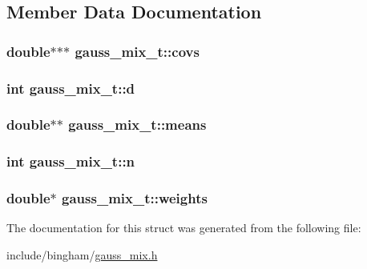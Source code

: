 \subsection{Member Data Documentation}
\hypertarget{structgauss__mix__t_acc4f1f686c1d0a9c61c7879fa7cfe7d5}{
\subsubsection[{covs}]{\setlength{\rightskip}{0pt plus 5cm}double$\ast$$\ast$$\ast$ {\bf gauss\_\-mix\_\-t::covs}}}
\label{structgauss__mix__t_acc4f1f686c1d0a9c61c7879fa7cfe7d5}
\hypertarget{structgauss__mix__t_a881d5ed8cdff3267b86104fc0fa59d23}{
\subsubsection[{d}]{\setlength{\rightskip}{0pt plus 5cm}int {\bf gauss\_\-mix\_\-t::d}}}
\label{structgauss__mix__t_a881d5ed8cdff3267b86104fc0fa59d23}
\hypertarget{structgauss__mix__t_abb85693a2d775f6ba34d1100b477c0fb}{
\subsubsection[{means}]{\setlength{\rightskip}{0pt plus 5cm}double$\ast$$\ast$ {\bf gauss\_\-mix\_\-t::means}}}
\label{structgauss__mix__t_abb85693a2d775f6ba34d1100b477c0fb}
\hypertarget{structgauss__mix__t_a9d5ac0b73ca6f79f565336d55bf5b542}{
\subsubsection[{n}]{\setlength{\rightskip}{0pt plus 5cm}int {\bf gauss\_\-mix\_\-t::n}}}
\label{structgauss__mix__t_a9d5ac0b73ca6f79f565336d55bf5b542}
\hypertarget{structgauss__mix__t_a6893efd45b8fc3c2429edb0ed86b4976}{
\subsubsection[{weights}]{\setlength{\rightskip}{0pt plus 5cm}double$\ast$ {\bf gauss\_\-mix\_\-t::weights}}}
\label{structgauss__mix__t_a6893efd45b8fc3c2429edb0ed86b4976}


The documentation for this struct was generated from the following file:\begin{DoxyCompactItemize}
\item 
include/bingham/\hyperlink{gauss__mix_8h}{gauss\_\-mix.h}\end{DoxyCompactItemize}
